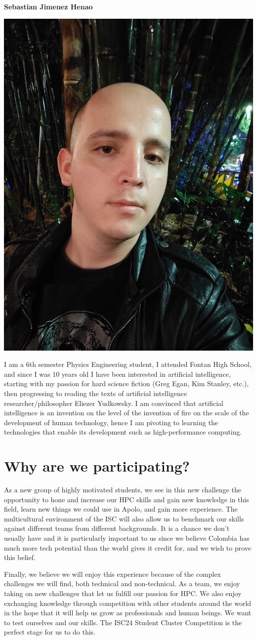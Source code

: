 \documentclass[11pt,a4paper,twocolumn]{article}
\begin{document}
\begin{center}
    \textbf{Sebastian Jimenez Henao}
\end{center}
\begin{center}
    \includegraphics[width = .4\linewidth]{Images/Sebastian Henao.jpg}
\end{center}
I am a 6th semester Physics Engineering student, I attended Fontan High School, and since I was 10 years old I have been interested in artificial intelligence, starting with my passion for hard science fiction (Greg Egan, Kim Stanley, etc.), then progressing to reading the texts of artificial intelligence researcher/philosopher Eliezer Yudkowsky. I am convinced that artificial intelligence is an invention on the level of the invention of fire on the scale of the development of human technology, hence I am pivoting to learning the technologies that enable its development such as high-performance computing.

\section{Why are we participating?}

As a new group of highly motivated students, we see in this new challenge the opportunity to hone and increase our HPC skills and gain new knowledge in this field, learn new things we could use in Apolo, and gain more experience. The multicultural environment of the ISC will also allow us to benchmark our skills against different teams from different backgrounds. It is a chance we don’t usually have and it is particularly important to us since we believe Colombia has much more tech potential than the world gives it credit for, and we wish to prove this belief.

Finally, we believe we will enjoy this experience because of the complex challenges we will find, both technical and non-technical. As a team, we enjoy taking on new challenges that let us fulfill our passion for HPC. We also enjoy exchanging knowledge through competition with other students around the world in the hope that it will help us grow as professionals and human beings. We want to test ourselves and our skills. The ISC24 Student Cluster Competition is the perfect stage for us to do this.
\end{document}
